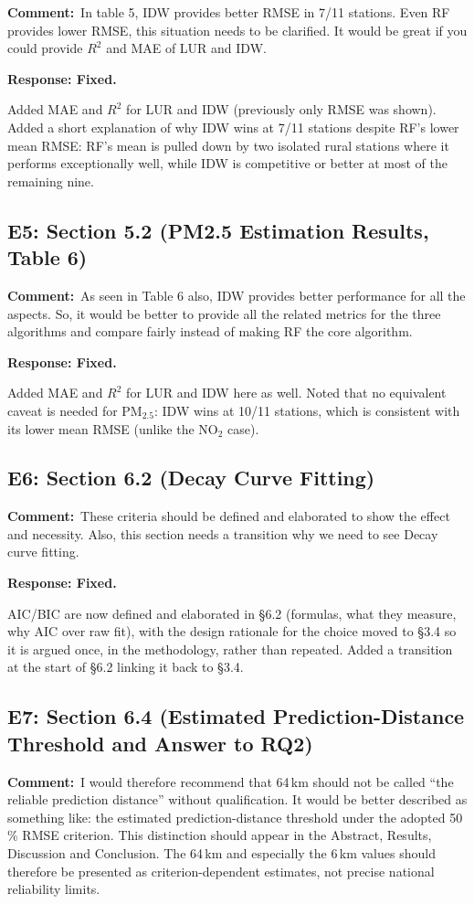 \documentclass[11pt,a4paper]{article}
\newcommand{\rjcomment}[1]{\par\noindent\textbf{Comment:}\ #1\par}
\newcommand{\rjresponse}[1]{\par\noindent\textbf{Response: #1}\par}
\begin{document}
\rjcomment{In table 5, IDW provides better RMSE in 7/11 stations. Even RF provides lower RMSE,
this situation needs to be clarified. It would be great if you could provide $R^2$ and MAE of
LUR and IDW.}

\rjresponse{Fixed.}
Added MAE and $R^2$ for LUR and IDW (previously only RMSE was shown). Added a short explanation
of why IDW wins at 7/11 stations despite RF's lower mean RMSE: RF's mean is pulled down by two
isolated rural stations where it performs exceptionally well, while IDW is competitive or better
at most of the remaining nine.

\subsection{E5: Section 5.2 (PM2.5 Estimation Results, Table 6)}

\rjcomment{As seen in Table 6 also, IDW provides better performance for all the aspects. So, it
would be better to provide all the related metrics for the three algorithms and compare fairly
instead of making RF the core algorithm.}

\rjresponse{Fixed.}
Added MAE and $R^2$ for LUR and IDW here as well. Noted that no equivalent caveat is needed for
PM$_{2.5}$: IDW wins at 10/11 stations, which is consistent with its lower mean RMSE (unlike the
NO$_2$ case).

\subsection{E6: Section 6.2 (Decay Curve Fitting)}

\rjcomment{These criteria should be defined and elaborated to show the effect and necessity.
Also, this section needs a transition why we need to see Decay curve fitting.}

\rjresponse{Fixed.}
AIC/BIC are now defined and elaborated in \S6.2 (formulas, what they measure, why AIC over raw
fit), with the design rationale for the choice moved to \S3.4 so it is argued once, in the
methodology, rather than repeated. Added a transition at the start of \S6.2 linking it back to
\S3.4.

\subsection{E7: Section 6.4 (Estimated Prediction-Distance Threshold and Answer to RQ2)}

\rjcomment{I would therefore recommend that 64\,km should not be called ``the reliable
prediction distance'' without qualification. It would be better described as something like: the
estimated prediction-distance threshold under the adopted 50\,\% RMSE criterion. This
distinction should appear in the Abstract, Results, Discussion and Conclusion. The 64\,km and
especially the 6\,km values should therefore be presented as criterion-dependent estimates, not
precise national reliability limits.}
\end{document}
